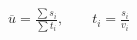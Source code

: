 \documentclass[border=2.5pt]{standalone}
\begin{document}
$\displaystyle \overline u=\frac{\sum s_i}{\sum t_i},\qquad t_i=\frac{s_i}{v_i}$
\end{document}
